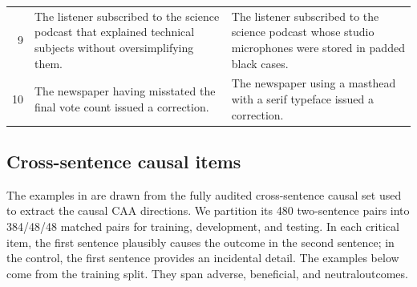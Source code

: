 \begin{table}[t]
\begin{tabular}{@{}r >{\raggedright\arraybackslash}p{} >{\raggedright\arraybackslash}p{}@{}}
9 & The listener subscribed to the science podcast that explained technical subjects without oversimplifying them. & The listener subscribed to the science podcast whose studio microphones were stored in padded black cases. \\
10 & The newspaper having misstated the final vote count issued a correction. & The newspaper using a masthead with a serif typeface issued a correction. \\
\bottomrule
\end{tabular}
\end{table}

\subsection{Cross-sentence causal items}
\label{app:cross-sentence-examples}

The examples in  are drawn from the fully audited cross-sentence causal
set used to extract the causal CAA directions. We partition its 480
two-sentence pairs into 384/48/48 matched pairs for training, development, and
testing. In each critical item, the first sentence plausibly causes the outcome
in the second sentence; in the control, the first sentence provides an
incidental detail. The examples below come from the training split.
They span adverse, beneficial, and neutraloutcomes.

